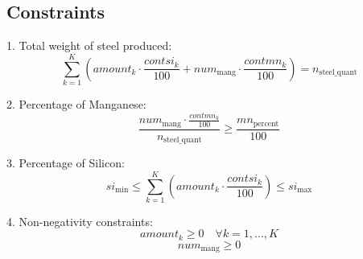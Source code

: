 \documentclass{article}
\begin{document}
\subsection*{Constraints}
1. Total weight of steel produced:
\[
\sum_{k=1}^{K} \left( amount_k \cdot \frac{contsi_k}{100} + num_{\text{mang}} \cdot \frac{contmn_k}{100} \right) = n_{\text{steel\_quant}}
\]

2. Percentage of Manganese:
\[
\frac{num_{\text{mang}} \cdot \frac{contmn_k}{100}}{n_{\text{steel\_quant}}} \geq \frac{mn_{\text{percent}}}{100}
\]

3. Percentage of Silicon:
\[
si_{\text{min}} \leq \sum_{k=1}^{K} \left( amount_k \cdot \frac{contsi_k}{100} \right) \leq si_{\text{max}}
\]

4. Non-negativity constraints:
\[
amount_k \geq 0 \quad \forall k = 1, \ldots, K
\]
\[
num_{\text{mang}} \geq 0 
\]
\end{document}
